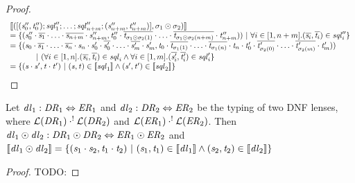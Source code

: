 \documentclass[numbers]{sigplanconf}
\begin{document}
\begin{proof}
  \[
    \begin{array}{l}
      [ \! [([(\mathit{s}_0'',\mathit{t}_0'');\mathit{sql}_1'';
      \ldots;
      \mathit{sql}_{n+m}'';(\mathit{s}_{n+m}'',\mathit{t}_{n+m}'')],
      \sigma_1\odot\sigma_2)] \! ]\\
      = \{(\mathit{s}_0''\cdot\overline{\mathit{s}_1}\cdot
      \ldots\cdot\overline{\mathit{s}_{n+m}}\cdot\mathit{s}_{n+m}'',
      \mathit{t}_0''\cdot\overline{\mathit{t}_{\sigma_1\odot\sigma_2(1)}}\cdot
      \ldots\cdot\overline{\mathit{t}_{\sigma_1\odot\sigma_2(n+m)}}\cdot\mathit{t}_{n+m}''))~|~
      \forall i\in[1,n+m].(\overline{\mathit{s}_i},\overline{\mathit{t}_i})\in\mathit{sql}_i''\}\\
      = \{(\mathit{s}_0\cdot\overline{\mathit{s}_1}\cdot\ldots\cdot
      \overline{\mathit{s}_n}\cdot\mathit{s}_n\cdot\mathit{s}_0'\cdot\overline{\mathit{s}_{0}'}\cdot
      \ldots\cdot\overline{\mathit{s}_m'}\cdot\mathit{s}_m',
      \mathit{t}_0\cdot\overline{\mathit{t}_{\sigma_1(1)}}\cdot\ldots\cdot
      \overline{\mathit{t}_{\sigma_1(n)}}\cdot\mathit{t}_n\cdot\mathit{t}_0'
      \cdot\overline{\mathit{t}_{\sigma_2(0)}'}\cdot
      \ldots\cdot\overline{\mathit{t}_{\sigma_2(m)}'}\cdot\mathit{t}_m'))\\
      \hspace*{3em}~|~
      (\forall i\in[1,n].
      (\overline{\mathit{s}_i},\overline{\mathit{t}_i})\in\mathit{sql}_i
      \wedge
      \forall i\in[1,m].
      (\overline{\mathit{s}_i'},\overline{\mathit{t}_i'})\in\mathit{sql}_i'\}\\
      = \{(\mathit{s}\cdot\mathit{s}',\mathit{t}\cdot\mathit{t}')~|~
      (\mathit{s},\mathit{t})\in[ \! [\mathit{sql}_1] \! ]
      \wedge
      (\mathit{s}',\mathit{t}')\in[ \! [\mathit{sql}_2] \! ]\}
    \end{array}
  \]
\end{proof}

\begin{lemma}
  \label{lem:typ_sem_concat}
  Let $\mathit{dl}_1 : \mathit{DR}_1 \Leftrightarrow \mathit{ER}_1$ and
  $\mathit{dl}_2 : \mathit{DR}_2 \Leftrightarrow \mathit{ER}_2$ be the typing of
  two DNF lenses, where
  $\mathcal{L}(\mathit{DR}_1) \cdot^! \mathcal{L}(\mathit{DR}_2)$ and
  $\mathcal{L}(\mathit{ER}_1) \cdot^! \mathcal{L}(\mathit{ER}_2)$.
  Then $\mathit{dl}_1\odot\mathit{dl}_2 :
  \mathit{DR}_1\odot\mathit{DR}_2 \Leftrightarrow
  \mathit{ER}_1\odot\mathit{ER}_2$ and
  $[ \! [\mathit{dl}_1\odot\mathit{dl}_2] \! ] =
  \{(\mathit{s}_1\cdot\mathit{s}_2,\mathit{t}_1\cdot\mathit{t}_2) ~|~
    (\mathit{s}_1,\mathit{t}_1)\in[ \! [\mathit{dl}_1] \! ]
    \wedge(\mathit{s}_2,\mathit{t}_2)\in[ \! [\mathit{dl}_2] \! ]\}$
\end{lemma}
\begin{proof}
  TODO:
\end{proof}
\end{document}
